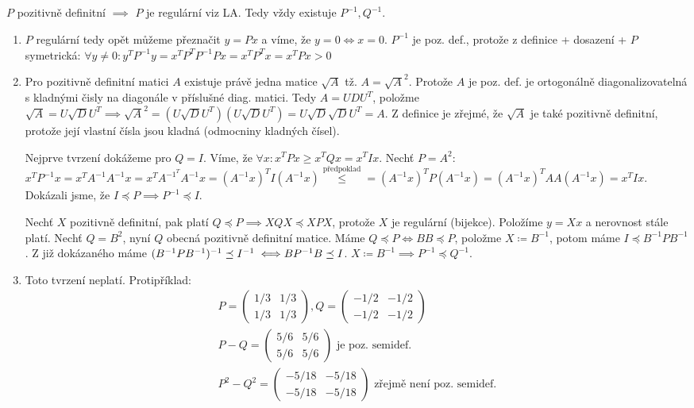 \documentclass[12pt, a4paper]{article}
\begin{document}
\subsection{}
$P$ pozitivně definitní $\implies$ $P$ je regulární viz LA. Tedy vždy existuje $P^{-1}, Q^{-1}$.
\begin{enumerate}[label=(\alph*)]
\item $P$ regulární tedy opět můžeme přeznačit $y = Px$ a víme, že $y=0 \iff x=0$. $P^{-1}$ je poz. def., protože z definice + dosazení + $P$ symetrická: $\forall y \neq 0: y^T P^{-1} y = x^T P^T P^{-1} P x = x^T P^T x = x^T P x > 0$
\item Pro pozitivně definitní matici $A$ existuje právě jedna matice $\sqrt{A}$ tž. $A = \sqrt{A}^2$. Protože $A$ je poz. def. je ortogonálně diagonalizovatelná s kladnými čisly na diagonále v příslušné diag. matici. Tedy $A = UDU^T$, položme $\sqrt{A}=U \sqrt{D} U^T \implies \sqrt{A}^2 = (U \sqrt{D} U^T)(U \sqrt{D} U^T) = U \sqrt{D} \sqrt{D} U^T = A$. Z definice je zřejmé, že $\sqrt{A}$ je také pozitivně definitní, protože její vlastní čísla jsou kladná (odmocniny kladných čísel).

Nejprve tvrzení dokážeme pro $Q = I$. Víme, že $\forall x: x^T P x \geq x^T Q x = x^T I x$. Nechť $P = A^2$: $x^T P^{-1} x = x^T A^{-1} A^{-1} x = x^T A^{{-1}^T} A^{-1} x = (A^{-1}x)^T I (A^{-1}x) \stackrel{\text{předpoklad}}{\leq} =  (A^{-1}x)^T P (A^{-1}x)=  (A^{-1}x)^T AA (A^{-1}x)=x^T I x$. Dokázali jsme, že $I \preceq P \implies P^{-1} \preceq I$.

Nechť $X$ pozitivně definitní, pak platí $Q \preceq P \implies XQX \preceq XPX$, protože $X$ je regulární (bijekce). Položíme $y= Xx$ a nerovnost stále platí. Nechť $Q = B^2$, nyní $Q$ obecná pozitivně definitní matice. Máme $Q \preceq P \iff BB \preceq P$, položme $X \coloneqq B^{-1}$, potom máme $I \preceq B^{-1}PB^{-1}$. Z již dokázaného máme $(B^{-1}PB^{-1})^{-1} \preceq I^{-1} \iff \\BP^{-1}B \preceq I$. $X \coloneqq B^{-1} \implies P^{-1} \preceq Q^{-1}$.

\item Toto tvrzení neplatí. Protipříklad:
\begin{gather*}
P = \begin{pmatrix}
1/3 & 1/3\\
1/3 & 1/3
\end{pmatrix},
Q = \begin{pmatrix}
-1/2 & -1/2\\
-1/2 & -1/2
\end{pmatrix}
\\
P-Q = \begin{pmatrix}
5/6 & 5/6\\
5/6 & 5/6
\end{pmatrix} \text{ je poz. semidef.}\\
P^2-Q^2 = \begin{pmatrix}
-5/18 & -5/18\\
-5/18 & -5/18
\end{pmatrix} \text{ zřejmě není poz. semidef.}
\end{gather*}
\end{enumerate}
\end{document}

